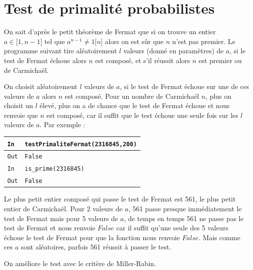 \documentclass[titlepage]{article}
\begin{document}
    \section{Test de primalité probabilistes}
    On sait d'après le petit théorème de Fermat que si on trouve un entier $a \in \lbrack1,n-1\rbrack$
    tel que $a^{n-1} \neq 1 \lbrack n \rbrack$ alors on est sûr que $n$ n'est pas premier. 
    Le programme suivant tire aléatoirement $l$ valeurs (donné en paramètres) de $a$, 
    si le test de Fermat échoue alors $n$ est composé, et s'il réussit alors $n$ est premier ou de Carmichaël.

    

    On choisit aléatoirement $l$ valeurs de $a$, si le test de Fermat échoue sur une de ces valeurs de $a$ alors
    $n$ est composé. Pour un nombre de Carmichaël $n$, plus on choisit un $l$ élevé, plus on a de chance que le test
    de Fermat échoue et nous renvoie que $n$ est composé, car il suffit que le test échoue une seule fois sur les $l$ 
    valeurs de $a$. \bigbreak
    Par exemple : \bigbreak

    \begin{tabularx}{12cm}{|p{0.60cm}|X|}
        \hline
        \rowcolor{gray}
        \texttt{In}
        & 
        \texttt{testPrimaliteFermat(2316845,200)}
        \\
        \hline
        \texttt{Out}
        &
        \texttt{False}
        \\
        \hline
        \rowcolor{gray}
        \texttt{In}
        & 
        \texttt{is\_prime(2316845)}
        \\
        \hline
        \texttt{Out}
        &
        \texttt{False}
        \\
        \hline
    \end{tabularx}
    \bigbreak

    Le plus petit entier composé qui passe le test de Fermat est 561, le plus petit entier de Carmichaël.
    Pour 2 valeurs de $a$, 561 passe presque immédiatement le test de Fermat mais pour 5 valeurs de $a$, 
    de temps en temps 561 ne passe pas le test de Fermat et nous renvoie $False$ car il suffit qu'une seule
    des 5 valeurs échoue le test de Fermat pour que la fonction nous renvoie $False$. Mais comme ces $a$
    sont aléatoires, parfois 561 réussit à passer le test.\newline

    On améliore le test avec le critère de Miller-Rabin.
\end{document}
